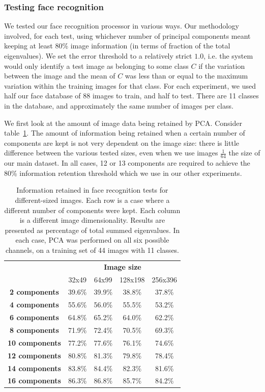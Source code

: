 \subsubsection{Testing face recognition}
\label{sec:pcaresults}

We tested our face recognition processor in various ways. Our methodology involved, for each test, using whichever number of principal components meant keeping at least 80\% image information (in terms of fraction of the total eigenvalues). We set the error threshold to a relatively strict $1.0$, i.e. the system would only identify a test image as belonging to some class $C$ if the variation between the image and the mean of $C$ was less than or equal to the maximum variation within the training images for that class. For each experiment, we used half our face database of 88 images to train, and half to test. There are 11 classes in the database, and approximately the same number of images per class.

We first look at the amount of image data being retained by PCA. Consider table~\ref{tbl:face-rec-1}. The amount of information being retained when a certain number of components are kept is not very dependent on the image size: there is little difference between the various tested sizes, even when we use images $\frac{1}{64}$ the size of our main dataset. In all cases, 12 or 13 components are required to achieve the 80\% information retention threshold which we use in our other experiments.

\begin{table}[htbp]
  \centering
  \begin{tabular}{c c c c c}
    \toprule
    & \multicolumn{4}{c}{\textbf{Image size}} \\
      &  32x49  &  64x99  & 128x198 & 256x396 \\
    \midrule
    \textbf{2 components} & 39.6\% & 39.9\% & 38.8\% & 37.8\% \\
    \textbf{4 components} & 55.6\% & 56.0\% & 55.5\% & 53.2\% \\
    \textbf{6 components} & 64.8\% & 65.2\% & 64.0\% & 62.2\% \\
    \textbf{8 components} & 71.9\% & 72.4\% & 70.5\% & 69.3\% \\
    \textbf{10 components} & 77.2\% & 77.6\% & 76.1\% & 74.6\% \\
    \textbf{12 components} & 80.8\% & 81.3\% & 79.8\% & 78.4\% \\
    \textbf{14 components} & 83.8\% & 84.4\% & 82.3\% & 81.6\% \\
    \textbf{16 components} & 86.3\% & 86.8\% & 85.7\% & 84.2\% \\
    \bottomrule
  \end{tabular}
  \caption[Information retained in face recognition tests for different-sized images]{Information retained in face recognition tests for different-sized images. Each row is a case where a different number of components were kept. Each column is a different image dimensionality. Results are presented as percentage of total summed eigenvalues. In each case, PCA was performed on all six possible channels, on a training set of 44 images with 11 classes.}
  \label{tbl:face-rec-1}
\end{table}

